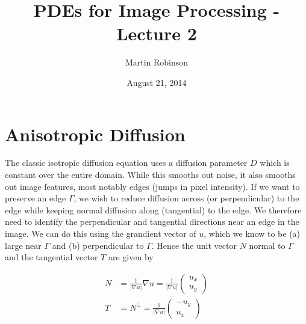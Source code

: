 \documentclass[11pt,a4paper,noindent]{article}
\begin{document}

\title{PDEs for Image Processing - Lecture 2}
\date{August 21, 2014}
\author{Martin Robinson}

\maketitle

\section{Anisotropic Diffusion}

The classic isotropic diffusion equation uses a diffusion parameter $D$
which is constant over the entire domain. While this smooths out noise,
it also smooths out image features, most notably edges (jumps in pixel
intensity). If we want to preserve an edge $\Gamma$, we wish to
reduce diffusion across (or perpendicular) to the edge while keeping
normal diffusion along (tangential) to the edge. We therefore need to
identify the perpendicular and tangential directions near an edge in the
image. We can do this using the grandient vector of $u$, which we
know to be (a) large near $\Gamma$ and (b) perpendicular to
$\Gamma$. Hence the unit vector $N$ normal to $\Gamma$ and the
tangential vector $T$ are given by

\begin{align}
N &= \frac{1}{|\nabla{u}|} \nabla{u} = \frac{1}{|\nabla{u}|}\begin{pmatrix} u_x \\u_y \end{pmatrix} \\
T &= N^\perp = \frac{1}{|\nabla{u}|}\begin{pmatrix} -u_y \\u_x \end{pmatrix}
\end{align}
\end{document}
